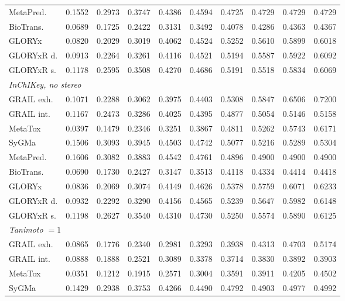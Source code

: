 \begin{table}[t]
\begin{threeparttable}
\begin{tabular}{lrrrrrrrrr}
\quad MetaPred. & 0.1552 & 0.2973 & 0.3747 & 0.4386 & 0.4594 & 0.4725 & 0.4729 & 0.4729 & 0.4729 \\
\quad BioTrans. & 0.0689 & 0.1725 & 0.2422 & 0.3131 & 0.3492 & 0.4078 & 0.4286 & 0.4363 & 0.4367 \\
\quad GLORYx & 0.0820 & 0.2029 & 0.3019 & 0.4062 & 0.4524 & 0.5252 & 0.5610 & 0.5899 & 0.6018 \\
\quad GLORYxR d. & 0.0913 & 0.2264 & 0.3261 & 0.4116 & 0.4521 & 0.5194 & 0.5587 & 0.5922 & 0.6092 \\
\quad GLORYxR s. & 0.1178 & 0.2595 & 0.3508 & 0.4270 & 0.4686 & 0.5191 & 0.5518 & 0.5834 & 0.6069 \\
\midrule
\multicolumn{10}{l}{\emph{InChIKey, no stereo}} \\
\quad GRAIL exh. & 0.1071 & 0.2288 & 0.3062 & 0.3975 & 0.4403 & 0.5308 & 0.5847 & 0.6506 & 0.7200 \\
\quad GRAIL int. & 0.1167 & 0.2473 & 0.3286 & 0.4025 & 0.4395 & 0.4877 & 0.5054 & 0.5146 & 0.5158 \\
\quad MetaTox & 0.0397 & 0.1479 & 0.2346 & 0.3251 & 0.3867 & 0.4811 & 0.5262 & 0.5743 & 0.6171 \\
\quad SyGMa & 0.1506 & 0.3093 & 0.3945 & 0.4503 & 0.4742 & 0.5077 & 0.5216 & 0.5289 & 0.5304 \\
\quad MetaPred. & 0.1606 & 0.3082 & 0.3883 & 0.4542 & 0.4761 & 0.4896 & 0.4900 & 0.4900 & 0.4900 \\
\quad BioTrans. & 0.0690 & 0.1730 & 0.2427 & 0.3147 & 0.3513 & 0.4118 & 0.4334 & 0.4414 & 0.4418 \\
\quad GLORYx & 0.0836 & 0.2069 & 0.3074 & 0.4149 & 0.4626 & 0.5378 & 0.5759 & 0.6071 & 0.6233 \\
\quad GLORYxR d. & 0.0932 & 0.2292 & 0.3290 & 0.4156 & 0.4565 & 0.5239 & 0.5647 & 0.5982 & 0.6148 \\
\quad GLORYxR s. & 0.1198 & 0.2627 & 0.3540 & 0.4310 & 0.4730 & 0.5250 & 0.5574 & 0.5890 & 0.6125 \\
\midrule
\multicolumn{10}{l}{\emph{Tanimoto $=1$}} \\
\quad GRAIL exh. & 0.0865 & 0.1776 & 0.2340 & 0.2981 & 0.3293 & 0.3938 & 0.4313 & 0.4703 & 0.5174 \\
\quad GRAIL int. & 0.0888 & 0.1888 & 0.2521 & 0.3089 & 0.3378 & 0.3714 & 0.3830 & 0.3892 & 0.3903 \\
\quad MetaTox & 0.0351 & 0.1212 & 0.1915 & 0.2571 & 0.3004 & 0.3591 & 0.3911 & 0.4205 & 0.4502 \\
\quad SyGMa & 0.1429 & 0.2938 & 0.3753 & 0.4266 & 0.4490 & 0.4792 & 0.4903 & 0.4977 & 0.4992 \\

\end{tabular}
\end{threeparttable}
\end{table}
